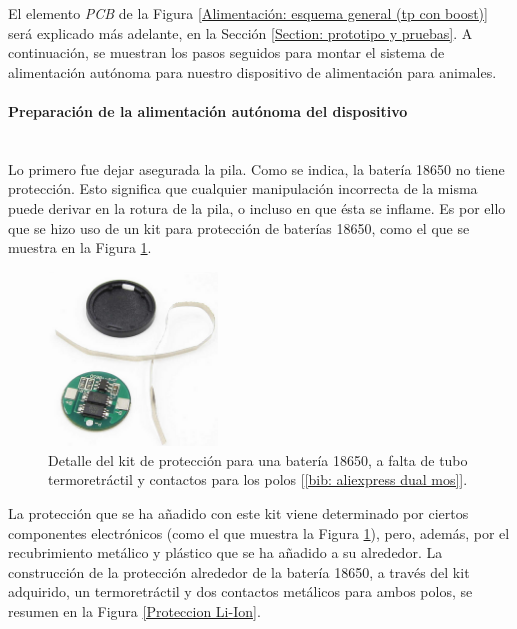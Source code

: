 \documentclass[12pt]{article}
\newcommand{\subsubsubsection}[1]{\paragraph{#1}\mbox{}\\}
\begin{document}
	\noindent El elemento \textit{PCB} de la Figura \ref{Alimentación: esquema general (tp con boost)} será explicado más adelante, en la Sección \ref{Section: prototipo y pruebas}. A continuación, se muestran los pasos seguidos para montar el sistema de alimentación autónoma para nuestro dispositivo de alimentación para animales. \\
	
	\subsubsubsection{Preparación de la alimentación autónoma del dispositivo}
	
	\noindent Lo primero fue dejar asegurada la pila. Como se indica, la batería 18650 no tiene protección. Esto significa que cualquier manipulación incorrecta de la misma puede derivar en la rotura de la pila, o incluso en que ésta se inflame. Es por ello que se hizo uso de un kit para protección de baterías 18650, como el que se muestra en la Figura \ref{Proteccion kit Li-Ion}.\\
	
	\pagebreak
	
	\begin{figure}[h!]
		\begin{center}
			\includegraphics[width=0.4\textwidth]{img/proteccion_18650.png}
			\caption{Detalle del kit de protección para una batería 18650, a falta de tubo termoretráctil y contactos para los polos [\ref{bib: aliexpress dual mos}].}
			\label{Proteccion kit Li-Ion}
		\end{center}
	\end{figure}
	
	\noindent La protección que se ha añadido con este kit viene determinado por ciertos componentes electrónicos (como el que muestra la Figura \ref{Proteccion kit Li-Ion}), pero, además, por el recubrimiento metálico y plástico que se ha añadido a su alrededor. La construcción de la protección alrededor de la batería 18650, a través del kit adquirido, un termoretráctil y dos contactos metálicos para ambos polos, se resumen en la Figura \ref{Proteccion Li-Ion}. \\
	
\end{document}

